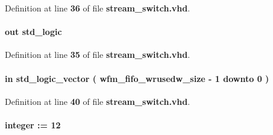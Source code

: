 Definition at line {\bf 36} of file {\bf stream\+\_\+switch.\+vhd}.

\paragraph[{wfm\+\_\+fifo\+\_\+wr}]{ {\bfseries \textcolor{keywordflow}{out}\textcolor{vhdlchar}{ }} {\bfseries \textcolor{comment}{std\+\_\+logic}\textcolor{vhdlchar}{ }} \hspace{0.3cm}{\ttfamily [Port]}}\label{classstream__switch_a776cfefc970ca63f31a2374b7fc28498}


Definition at line {\bf 35} of file {\bf stream\+\_\+switch.\+vhd}.

\paragraph[{wfm\+\_\+fifo\+\_\+wrusedw}]{ {\bfseries \textcolor{keywordflow}{in}\textcolor{vhdlchar}{ }} {\bfseries \textcolor{comment}{std\+\_\+logic\+\_\+vector}\textcolor{vhdlchar}{ }\textcolor{vhdlchar}{(}\textcolor{vhdlchar}{ }\textcolor{vhdlchar}{ }\textcolor{vhdlchar}{ }\textcolor{vhdlchar}{ }{\bfseries {\bf wfm\+\_\+fifo\+\_\+wrusedw\+\_\+size}} \textcolor{vhdlchar}{-\/}\textcolor{vhdlchar}{ } \textcolor{vhdldigit}{1} \textcolor{vhdlchar}{ }\textcolor{keywordflow}{downto}\textcolor{vhdlchar}{ }\textcolor{vhdlchar}{ } \textcolor{vhdldigit}{0} \textcolor{vhdlchar}{ }\textcolor{vhdlchar}{)}\textcolor{vhdlchar}{ }} \hspace{0.3cm}{\ttfamily [Port]}}\label{classstream__switch_a1e81770ee59b5bf432901508d25e7300}


Definition at line {\bf 40} of file {\bf stream\+\_\+switch.\+vhd}.

\paragraph[{wfm\+\_\+fifo\+\_\+wrusedw\+\_\+size}]{ {\bfseries \textcolor{vhdlchar}{ }} {\bfseries \textcolor{comment}{integer}\textcolor{vhdlchar}{ }\textcolor{vhdlchar}{ }\textcolor{vhdlchar}{\+:}\textcolor{vhdlchar}{=}\textcolor{vhdlchar}{ }\textcolor{vhdlchar}{ } \textcolor{vhdldigit}{12} \textcolor{vhdlchar}{ }} \hspace{0.3cm}{\ttfamily [Generic]}}\label{classstream__switch_ac2f158b69e75a48ff97f4682b638fdf0}


